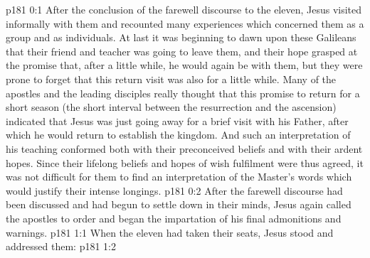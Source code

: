 \author{Midwayer Commission}
\vs p181 0:1 After the conclusion of the farewell discourse to the eleven, Jesus visited informally with them and recounted many experiences which concerned them as a group and as individuals. At last it was beginning to dawn upon these Galileans that their friend and teacher was going to leave them, and their hope grasped at the promise that, after a little while, he would again be with them, but they were prone to forget that this return visit was also for a little while. Many of the apostles and the leading disciples really thought that this promise to return for a short season (the short interval between the resurrection and the ascension) indicated that Jesus was just going away for a brief visit with his Father, after which he would return to establish the kingdom. And such an interpretation of his teaching conformed both with their preconceived beliefs and with their ardent hopes. Since their lifelong beliefs and hopes of wish fulfilment were thus agreed, it was not difficult for them to find an interpretation of the Master’s words which would justify their intense longings.
\vs p181 0:2 After the farewell discourse had been discussed and had begun to settle down in their minds, Jesus again called the apostles to order and began the impartation of his final admonitions and warnings.
\vs p181 1:1 When the eleven had taken their seats, Jesus stood and addressed them: 
\vs p181 1:2 
